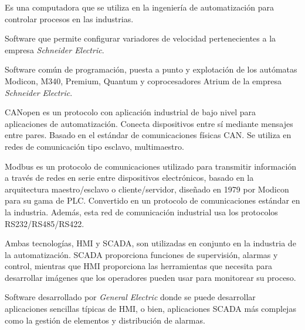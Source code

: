 \begin{tcolorbox}[colback=blue!5!white,colframe=blue!75!black,title=PLC]
	Es una computadora que se utiliza en la ingeniería de automatización para controlar procesos en las industrias.
\end{tcolorbox}

\begin{tcolorbox}[colback=blue!5!white,colframe=blue!75!black,title=SoMove]
	Software que permite configurar variadores de velocidad pertenecientes a la empresa \textit{Schneider Electric}.
\end{tcolorbox}

\begin{tcolorbox}[colback=blue!5!white,colframe=blue!75!black,title=Unity Pro]
	Software común de programación, puesta a punto y
	explotación de los autómatas Modicon, M340, Premium, Quantum y
	coprocesadores Atrium de la empresa \textit{Schneider Electric}.
\end{tcolorbox}

\begin{tcolorbox}[colback=blue!5!white,colframe=blue!75!black,title=CANopen]
	CANopen es un protocolo con aplicación industrial de bajo nivel para aplicaciones de automatización. Conecta dispositivos entre sí mediante mensajes entre pares. Basado en el estándar de comunicaciones físicas CAN. Se utiliza en redes de comunicación tipo esclavo, multimaestro. 
\end{tcolorbox}

\begin{tcolorbox}[colback=blue!5!white,colframe=blue!75!black,title=ModBus]
	Modbus es un protocolo de comunicaciones utilizado para transmitir información a través de redes en serie entre dispositivos electrónicos, basado en la arquitectura maestro/esclavo o cliente/servidor, diseñado en 1979 por Modicon para su gama de PLC. Convertido en un protocolo de comunicaciones estándar en la industria. Además, esta red de comunicación industrial usa los protocolos RS232/RS485/RS422.
\end{tcolorbox}

\begin{tcolorbox}[colback=blue!5!white,colframe=blue!75!black,title=HMI - SCADA]
	Ambas tecnologías, HMI y SCADA, son utilizadas en conjunto en la industria de la automatización. SCADA proporciona funciones de supervisión, alarmas y control, mientras que HMI proporciona las herramientas que necesita para desarrollar imágenes que los operadores pueden usar para monitorear su proceso.
\end{tcolorbox}

\begin{tcolorbox}[colback=blue!5!white,colframe=blue!75!black,title=iFIX]
	Software desarrollado por \textit{General Electric} donde se puede desarrollar aplicaciones sencillas típicas de HMI, o bien, aplicaciones SCADA más complejas como la gestión de elementos y distribución de alarmas.
\end{tcolorbox}
\newpage